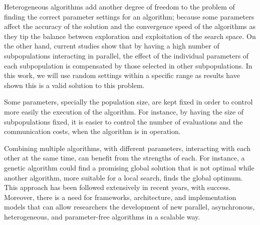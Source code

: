 \documentclass[review]{elsarticle}
\begin{document}
Heterogeneous algorithms add another degree of freedom to the problem of finding
the correct parameter settings for an algorithm; because some parameters affect
the accuracy of the solution and the convergence speed of the algorithms as they
tip the balance between exploration and exploitation of the search space. On the
other hand, current studies show that by having a high number of subpopulations
interacting in parallel, the effect of the individual parameters of each
subpopulation is compensated by those selected in other subpopulations. In this
work, we will use random settings within a specific range as results have shown
this is a valid solution to this problem. 

Some parameters, specially the population size, are
kept fixed in order to control more easily the execution of the algorithm. For
instance, by having the size of subpopulations fixed, it is easier to control
the number of evaluations and the communication costs, when the algorithm is in
operation.

Combining multiple algorithms, with different parameters, interacting with each
other at the same time, can benefit from the strengths of each. For instance, a
genetic algorithm could find a promising global solution that is not optimal
while another algorithm, more suitable for a local search, finds the global
optimum. This approach has been followed extensively in recent years, with
success. Moreover, there is a need for frameworks, architecture, and
implementation models that can allow researchers the development of new
parallel, asynchronous, heterogeneous, and parameter-free algorithms in a scalable way.  




\end{document}

